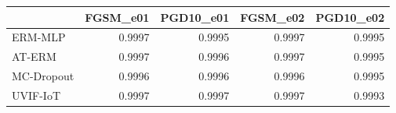 \begin{tabular}{lrrrr}
\toprule
 & FGSM_e01 & PGD10_e01 & FGSM_e02 & PGD10_e02 \\
\midrule
ERM-MLP & 0.9997 & 0.9995 & 0.9997 & 0.9995 \\
AT-ERM & 0.9997 & 0.9996 & 0.9997 & 0.9995 \\
MC-Dropout & 0.9996 & 0.9996 & 0.9996 & 0.9995 \\
UVIF-IoT & 0.9997 & 0.9997 & 0.9997 & 0.9993 \\
\bottomrule
\end{tabular}
